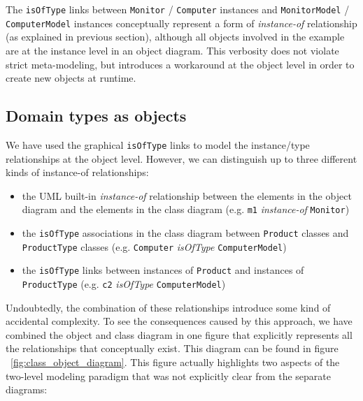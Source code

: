 The \texttt{isOfType} links between \texttt{Monitor} / \texttt{Computer} instances and \texttt{MonitorModel} / \texttt{ComputerModel} instances conceptually represent a form of \textit{instance-of} relationship (as explained in previous section), although all objects involved in the example are at the instance level in an object diagram. This verbosity does not violate strict meta-modeling, but introduces a workaround at the object level in order to create new objects at runtime.

\subsection{Domain types as objects}

We have used the graphical \texttt{isOfType} links to model the instance/type relationships at the object level. However, we can distinguish up to three different kinds of instance-of relationships:

\begin{itemize}
\item{the UML built-in \textit{instance-of} relationship between the elements in the object diagram and the elements in the class diagram (e.g. \texttt{m1} \textit{instance-of} \texttt{Monitor})}
\item{the \texttt{isOfType} associations in the class diagram between \texttt{Product} classes and \texttt{ProductType} classes (e.g. \texttt{Computer} \textit{isOfType} \texttt{ComputerModel})}
\item{the \texttt{isOfType} links between instances of \texttt{Product} and instances of \texttt{ProductType} (e.g. \texttt{c2} \textit{isOfType} \texttt{ComputerModel})}
\end{itemize}
Undoubtedly, the combination of these relationships introduce some kind of accidental complexity. To see the consequences caused by this approach, we have combined the object and class diagram in one figure that explicitly represents all the relationships that conceptually exist. This diagram can be found in figure ~\ref{fig:class_object_diagram}. This figure actually highlights two aspects of the two-level modeling paradigm that was not explicitly clear from the separate diagrams:

